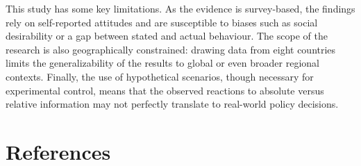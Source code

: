 \documentclass[
  12pt,
  a4paper,
]{article}
\begin{document}
This study has some key limitations. As the evidence is survey-based, the findings rely on self-reported attitudes and are susceptible to biases such as social desirability or a gap between stated and actual behaviour. The scope of the research is also geographically constrained: drawing data from eight countries limits the generalizability of the results to global or even broader regional contexts. Finally, the use of hypothetical scenarios, though necessary for experimental control, means that the observed reactions to absolute versus relative information may not perfectly translate to real-world policy decisions.

\section*{References}\label{references}
\end{document}
